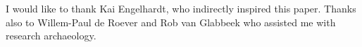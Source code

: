 \documentclass[sigplan,review]{acmart}\settopmatter{printfolios=true,printccs=false,printacmref=false}
\begin{document}
\begin{acks}                            %
I would like to thank Kai Engelhardt, who
indirectly inspired this paper. Thanks also to Willem-Paul de Roever and Rob van Glabbeek
who assisted me with research archaeology.
\end{acks}





%
\end{document}
